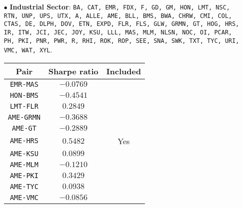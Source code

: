\documentclass{paper}
\begin{document}
\begin{itemize}
\item[$\bullet$] \textbf{Industrial Sector}: \texttt{BA, CAT, EMR, FDX, F, GD, GM, HON, LMT, NSC, RTN, UNP, UPS, UTX, A, ALLE, AME, BLL, BMS, BWA, CHRW, CMI, COL, CTAS, DE, DLPH, DOV, ETN, EXPD, FLR, FLS, GLW, GRMN, GT, HOG, HRS, IR, ITW, JCI, JEC, JOY, KSU, LLL, MAS, MLM, NLSN, NOC, OI, PCAR, PH, PKI, PNR, PWR, R, RHI, ROK, ROP, SEE, SNA, SWK, TXT, TYC, URI, VMC, WAT, XYL}.
\begin{center}
\begin{tabular}{| c | c | c | }
\hline
\textbf{Pair} & \textbf{Sharpe ratio}  & \textbf{Included} \\ \hline
\texttt{EMR-MAS} & $-0.0769$ &   \\ \hline
\texttt{HON-BMS} & $-0.4541$ &   \\ \hline
\texttt{LMT-FLR} & $0.2849$ &   \\ \hline
\texttt{AME-GRMN} & $-0.3688$ &   \\ \hline
\texttt{AME-GT} & $-0.2889$ &   \\ \hline
\texttt{AME-HRS} & $0.5482$ & Yes  \\ \hline
\texttt{AME-KSU} & $0.0899$ &  \\ \hline
\texttt{AME-MLM} & $-0.1210$ &  \\ \hline
\texttt{AME-PKI} & $0.3429$ &  \\ \hline
\texttt{AME-TYC} & $0.0938$ &  \\ \hline
\texttt{AME-VMC} & $-0.0856$ &  \\ \hline
\end{tabular}
\end{center}



\end{itemize}
\end{document}
